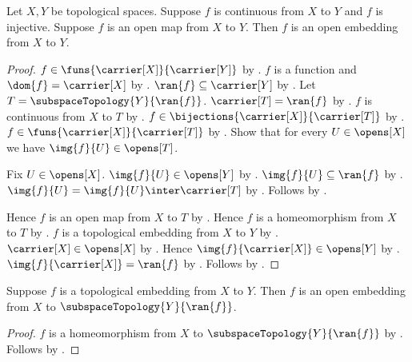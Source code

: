 \begin{theorem}\label{continuous_injective_open_map_is_open_embedding}
    Let $X,Y$ be topological spaces.
    Suppose $f$ is continuous from $X$ to $Y$ and $f$ is injective.
    Suppose $f$ is an open map from $X$ to $Y$.
    Then $f$ is an open embedding from $X$ to $Y$.
\end{theorem}
\begin{proof}
    $f\in\funs{\carrier[X]}{\carrier[Y]}$ by .
    $f$ is a function and $\dom{f}=\carrier[X]$ by
        .
    $\ran{f}\subseteq\carrier[Y]$ by .
    Let $T=\subspaceTopology{Y}{\ran{f}}$.
    $\carrier[T]=\ran{f}$ by .
    $f$ is continuous from $X$ to $T$ by
        .
    $f\in\bijections{\carrier[X]}{\carrier[T]}$ by
        .
    $f\in\funs{\carrier[X]}{\carrier[T]}$ by .
    Show that for every $U\in\opens[X]$ we have $\img{f}{U}\in\opens[T]$.
    \begin{subproof}
        Fix $U\in\opens[X]$.
        $\img{f}{U}\in\opens[Y]$ by .
        $\img{f}{U}\subseteq\ran{f}$ by .
        $\img{f}{U}=\img{f}{U}\inter\carrier[T]$ by
            .
        Follows by .
    \end{subproof}
    Hence $f$ is an open map from $X$ to $T$ by .
    Hence $f$ is a homeomorphism from $X$ to $T$ by
        .
    $f$ is a topological embedding from $X$ to $Y$ by
        .
    $\carrier[X]\in\opens[X]$ by .
    Hence $\img{f}{\carrier[X]}\in\opens[Y]$ by .
    $\img{f}{\carrier[X]}=\ran{f}$ by .
    Follows by .
\end{proof}

\begin{corollary}\label{topological_embedding_corestriction}
    Suppose $f$ is a topological embedding from $X$ to $Y$.
    Then $f$ is an open embedding from $X$ to $\subspaceTopology{Y}{\ran{f}}$.
\end{corollary}
\begin{proof}
    $f$ is a homeomorphism from $X$ to $\subspaceTopology{Y}{\ran{f}}$
        by .
    Follows by .
\end{proof}

